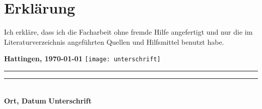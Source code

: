 \documentclass[./entry.tex]{subfiles}
\begin{document}
    \chapter{Erklärung}

    Ich erkläre, dass ich die Facharbeit ohne fremde Hilfe angefertigt und nur die
    im Literaturverzeichnis angeführten Quellen und Hilfsmittel benutzt habe.


    \vspace{2cm}
    \noindent\textbf{Hattingen, \today} \hfill \texttt{[image: unterschrift]} \\
    \noindent\rule{5.5cm}{0.4pt} \hfill \rule{5.5cm}{0.4pt} \\
    \textbf{Ort, Datum} \hfill \textbf{Unterschrift}
\end{document}
